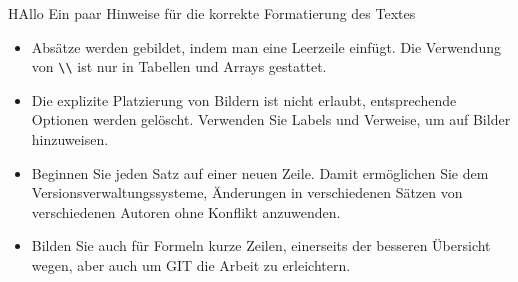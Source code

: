 \begin{refsection}
HAllo
Ein paar Hinweise für die korrekte Formatierung des Textes
\begin{itemize}
\item
Absätze werden gebildet, indem man eine Leerzeile einfügt.
Die Verwendung von \verb+\\+ ist nur in Tabellen und Arrays gestattet.
\item
Die explizite Platzierung von Bildern ist nicht erlaubt, entsprechende
Optionen werden gelöscht. 
Verwenden Sie Labels und Verweise, um auf Bilder hinzuweisen.
\item
Beginnen Sie jeden Satz auf einer neuen Zeile. 
Damit ermöglichen Sie dem Versionsverwaltungssysteme, Änderungen
in verschiedenen Sätzen von verschiedenen Autoren ohne Konflikt 
anzuwenden.
\item 
Bilden Sie auch für Formeln kurze Zeilen, einerseits der besseren
Übersicht wegen, aber auch um GIT die Arbeit zu erleichtern.
\end{itemize}






\printbibliography[heading=subbibliography]
\end{refsection}
